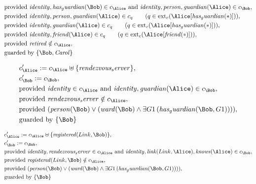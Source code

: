 \begin{align*}
&
\text{provided } 
\mathit{
identity
}
,
\mathit{
has_guardian
}
(
\Bob
)
 \in c_
{
\Alice
}
 \text{ and } 
\mathit{
identity
}
,
\mathit{
person
}
,
\mathit{
guardian
}
(
\Alice
)
 \in c_
{
\Bob
}
,\\
&
\text{provided } 
\mathit{
identity
}
,
\mathit{
person
}
,
\mathit{
guardian
}
(
\Alice
)
 \in c_
q
 \qquad (
q \in 
\mathrm{ext}_c(
\Alice
[
\mathit{
has_guardian
}
(
\ast
)
]
)
)
,\\
&
\text{provided } 
\mathit{
identity
}
,
\mathit{
guardian
}
(
\Alice
)
 \in c_
q
 \qquad (
q \in 
\mathrm{ext}_c(
\Alice
[
\mathit{
has_guardian
}
(
\ast
)
]
)
)
,\\
&
\text{provided } 
\mathit{
identity
}
,
\mathit{
friend
}
(
\Alice
)
 \in c_
q
 \qquad (
q \in 
\mathrm{ext}_c(
\Alice
[
\mathit{
friend
}
(
\ast
)
]
)
)
,\\
&
\text{provided } 
\mathit{
retired
}
 \notin c_
{
\Alice
}
,\\
&
\text{guarded by } \{
\Bob
,
\mathit{Carol}
\}
\end{align*}

\begin{align*}
&
c'_
{
\Alice
}
 := 
c_
{
\Alice
}
 \uplus 
\{
\mathit{
rendezvous_server
}
\}
,\\
&
c'_
{
\Bob
}
 := 
c_
{
\Bob
}
,\\
&
\text{provided } 
\mathit{
identity
}
 \in c_
{
\Alice
}
 \text{ and } 
\mathit{
identity
}
,
\mathit{
guardian
}
(
\Alice
)
 \in c_
{
\Bob
}
,\\
&
\text{provided } 
\mathit{
rendezvous_server
}
 \notin c_
{
\Alice
}
,\\
&
\text{provided } 
(
\mathit{
person
}
(
\Bob
)
\lor
(
\mathit{
ward
}
(
\Bob
)
\land
\exists 
G1
\,(
\mathit{
has_guardian
}
(
\Bob
,
G1
)
)
)
)
,\\
&
\text{guarded by } \{
\Bob
\}
\end{align*}

\begin{align*}
&
c'_
{
\Alice
}
 := 
c_
{
\Alice
}
 \uplus 
\{
\mathit{
registered
}
(
Link
,
\Bob
)
\}
,\\
&
c'_
{
\Bob
}
 := 
c_
{
\Bob
}
,\\
&
\text{provided } 
\mathit{
identity
}
,
\mathit{
rendezvous_server
}
 \in c_
{
\Alice
}
 \text{ and } 
\mathit{
identity
}
,
\mathit{
link
}
(
Link
,
\Alice
)
,
\mathit{
knows
}
(
\Alice
)
 \in c_
{
\Bob
}
,\\
&
\text{provided } 
\mathit{
registered
}
(
Link
,
\Bob
)
 \notin c_
{
\Alice
}
,\\
&
\text{provided } 
(
\mathit{
person
}
(
\Bob
)
\lor
(
\mathit{
ward
}
(
\Bob
)
\land
\exists 
G1
\,(
\mathit{
has_guardian
}
(
\Bob
,
G1
)
)
)
)
,\\
&
\text{guarded by } \{
\Bob
\}
\end{align*}

